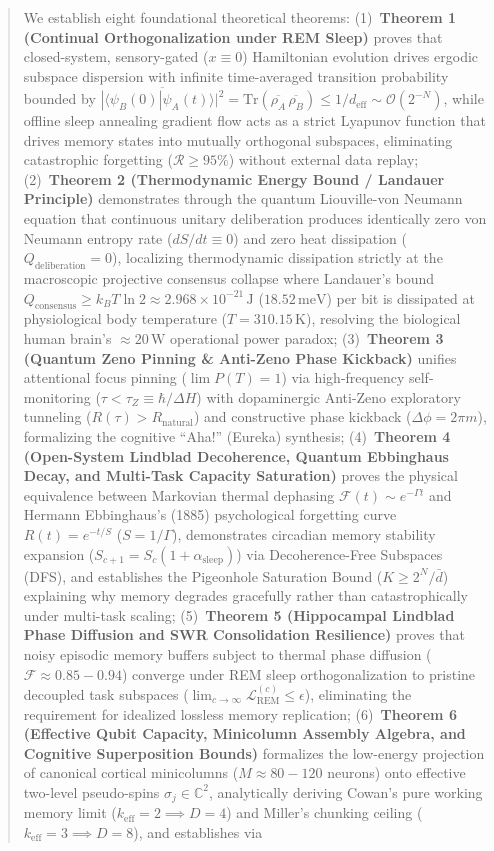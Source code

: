 \documentclass[10pt,twocolumn,3p]{article}
\begin{document}
\begin{@twocolumnfalse}
\begin{abstract}
    We establish eight foundational theoretical theorems: (1)~\textbf{Theorem 1 (Continual Orthogonalization under REM Sleep)} proves that closed-system, sensory-gated ($x \equiv 0$) Hamiltonian evolution drives ergodic subspace dispersion with infinite time-averaged transition probability bounded by $\overline{|\langle \psi_B(0) | \psi_A(t) \rangle|^2} = \text{Tr}(\overline{\rho_A}\,\overline{\rho_B}) \le 1/d_{\text{eff}} \sim \mathcal{O}(2^{-N})$, while offline sleep annealing gradient flow acts as a strict Lyapunov function that drives memory states into mutually orthogonal subspaces, eliminating catastrophic forgetting ($\mathcal{R} \ge 95\%$) without external data replay; (2)~\textbf{Theorem 2 (Thermodynamic Energy Bound / Landauer Principle)} demonstrates through the quantum Liouville-von Neumann equation that continuous unitary deliberation produces identically zero von Neumann entropy rate ($dS/dt \equiv 0$) and zero heat dissipation ($Q_{\text{deliberation}} = 0$), localizing thermodynamic dissipation strictly at the macroscopic projective consensus collapse where Landauer's bound $Q_{\text{consensus}} \ge k_B T \ln 2 \approx 2.968 \times 10^{-21}\,\text{J}$ ($18.52\,\text{meV}$) per bit is dissipated at physiological body temperature ($T = 310.15\,\text{K}$), resolving the biological human brain's $\approx 20\,\text{W}$ operational power paradox; (3)~\textbf{Theorem 3 (Quantum Zeno Pinning \& Anti-Zeno Phase Kickback)} unifies attentional focus pinning ($\lim P(T) = 1$) via high-frequency self-monitoring ($\tau < \tau_Z \equiv \hbar/\Delta H$) with dopaminergic Anti-Zeno exploratory tunneling ($R(\tau) > R_{\text{natural}}$) and constructive phase kickback ($\Delta \phi = 2\pi m$), formalizing the cognitive ``Aha!'' (Eureka) synthesis; (4)~\textbf{Theorem 4 (Open-System Lindblad Decoherence, Quantum Ebbinghaus Decay, and Multi-Task Capacity Saturation)} proves the physical equivalence between Markovian thermal dephasing $\mathcal{F}(t) \sim e^{-\Gamma t}$ and Hermann Ebbinghaus's (1885) psychological forgetting curve $R(t) = e^{-t/S}$ ($S = 1/\Gamma$), demonstrates circadian memory stability expansion ($S_{c+1} = S_c(1+\alpha_{\text{sleep}})$) via Decoherence-Free Subspaces (DFS), and establishes the Pigeonhole Saturation Bound ($K \ge 2^N/\bar{d}$) explaining why memory degrades gracefully rather than catastrophically under multi-task scaling; (5)~\textbf{Theorem 5 (Hippocampal Lindblad Phase Diffusion and SWR Consolidation Resilience)} proves that noisy episodic memory buffers subject to thermal phase diffusion ($\mathcal{F} \approx 0.85 - 0.94$) converge under REM sleep orthogonalization to pristine decoupled task subspaces ($\lim_{c \to \infty} \mathcal{L}_{\text{REM}}^{(c)} \le \epsilon$), eliminating the requirement for idealized lossless memory replication; (6)~\textbf{Theorem 6 (Effective Qubit Capacity, Minicolumn Assembly Algebra, and Cognitive Superposition Bounds)} formalizes the low-energy projection of canonical cortical minicolumns ($M \approx 80 - 120$ neurons) onto effective two-level pseudo-spins $\sigma_j \in \mathbb{C}^2$, analytically deriving Cowan's pure working memory limit ($k_{\text{eff}} = 2 \implies D = 4$) and Miller's chunking ceiling ($k_{\text{eff}} = 3 \implies D = 8$), and establishes via 
\end{abstract}
\end{@twocolumnfalse}
\end{document}
